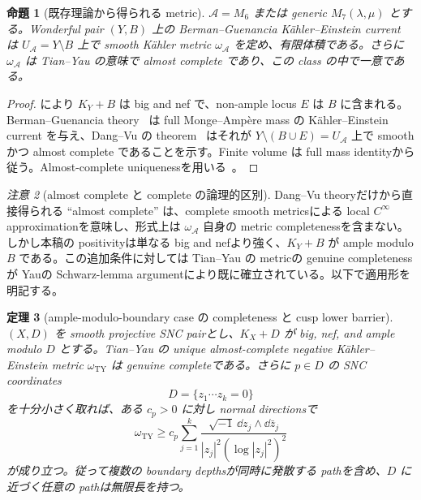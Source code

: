 \documentclass[11pt,a4paper]{ltjsarticle}
\newcommand{\cA}{\mathcal A}\newcommand{\cB}{\mathcal B}\newcommand{\cC}{\mathcal C}
\theoremstyle{plain}
\newtheorem{theorem}{定理}[section]\newtheorem{proposition}[theorem]{命題}
\theoremstyle{definition}
\theoremstyle{remark}
\newtheorem{remark}[theorem]{注意}\newtheorem{warning}[theorem]{警告}
\begin{document}
\begin{proposition}[既存理論から得られる metric]\label{prop:almost-complete}
$\cA=M_6$ または generic $M_7(\lambda,\mu)$ とする。Wonderful pair $(Y,B)$ 上の Berman--Guenancia K\"ahler--Einstein current は $U_{\cA}=Y\setminus B$ 上で smooth K\"ahler metric $\omega_{\cA}$ を定め、有限体積である。さらに $\omega_{\cA}$ は Tian--Yau の意味で almost complete であり、この class の中で一意である。
\end{proposition}

\begin{proof}
 により $K_Y+B$ は big and nef で、non-ample locus $E$ は $B$ に含まれる。Berman--Guenancia theory~\cite{BG} は full Monge--Amp\`ere mass の K\"ahler--Einstein current を与え、Dang--Vu の theorem~\cite{DangVu} はそれが $Y\setminus(B\cup E)=U_{\cA}$ 上で smooth かつ almost complete であることを示す。Finite volume は full mass identityから従う。Almost-complete uniquenessを用いる~\cite{DangVu}。
\end{proof}

\begin{remark}[almost complete と complete の論理的区別]\label{rem:almost-vs-complete}
Dang--Vu theoryだけから直接得られる ``almost complete'' は、complete smooth metricsによる local $C^\infty$ approximationを意味し、形式上は $\omega_{\cA}$ 自身の metric completenessを含まない。しかし本稿の positivityは単なる big and nefより強く、$K_Y+B$ が ample modulo $B$ である。この追加条件に対しては Tian--Yau の metricの genuine completenessが Yauの Schwarz-lemma argumentにより既に確立されている。以下で適用形を明記する。
\end{remark}

\begin{theorem}[ample-modulo-boundary case の completeness と cusp lower barrier]\label{thm:ty-yau-completeness}
$(X,D)$ を smooth projective SNC pairとし、$K_X+D$ が big, nef, and ample modulo $D$ とする。Tian--Yau の unique almost-complete negative K\"ahler--Einstein metric $\omega_{\mathrm{TY}}$ は genuine completeである。さらに $p\in D$ の SNC coordinates
\[
 D=\{z_1\cdots z_k=0\}
\]
を十分小さく取れば、ある $c_p>0$ に対し normal directionsで
\[
 \omega_{\mathrm{TY}}
 \ge c_p\sum_{j=1}^k
 \frac{\sqrt{-1}\,\dd z_j\wedge\dd\bar z_j}
 {|z_j|^2(\log|z_j|^2)^2}
\]
が成り立つ。従って複数の boundary depthsが同時に発散する pathを含め、$D$ に近づく任意の pathは無限長を持つ。
\end{theorem}
\end{document}
